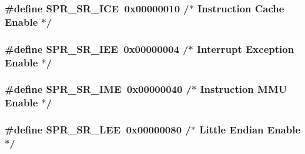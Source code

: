 \hypertarget{spr-defs_8h_a386792a3bd4348db52eb28cbd133a0d0}{
\subsubsection[{\-S\-P\-R\-\_\-\-S\-R\-\_\-\-I\-C\-E}]{\setlength{\rightskip}{0pt plus 5cm}\#define {\bf \-S\-P\-R\-\_\-\-S\-R\-\_\-\-I\-C\-E}~0x00000010  /$\ast$ Instruction Cache Enable $\ast$/}}\label{spr-defs_8h_a386792a3bd4348db52eb28cbd133a0d0}
\hypertarget{spr-defs_8h_a9a5f711e7e1346e1516179b4737fd54d}{
\subsubsection[{\-S\-P\-R\-\_\-\-S\-R\-\_\-\-I\-E\-E}]{\setlength{\rightskip}{0pt plus 5cm}\#define {\bf \-S\-P\-R\-\_\-\-S\-R\-\_\-\-I\-E\-E}~0x00000004  /$\ast$ Interrupt Exception Enable $\ast$/}}\label{spr-defs_8h_a9a5f711e7e1346e1516179b4737fd54d}
\hypertarget{spr-defs_8h_a9e9f5f7a1059b61a5611f66400092d9e}{
\subsubsection[{\-S\-P\-R\-\_\-\-S\-R\-\_\-\-I\-M\-E}]{\setlength{\rightskip}{0pt plus 5cm}\#define {\bf \-S\-P\-R\-\_\-\-S\-R\-\_\-\-I\-M\-E}~0x00000040  /$\ast$ Instruction M\-M\-U Enable $\ast$/}}\label{spr-defs_8h_a9e9f5f7a1059b61a5611f66400092d9e}
\hypertarget{spr-defs_8h_ae498c800649c3db2373a1ceb2ad1e573}{
\subsubsection[{\-S\-P\-R\-\_\-\-S\-R\-\_\-\-L\-E\-E}]{\setlength{\rightskip}{0pt plus 5cm}\#define {\bf \-S\-P\-R\-\_\-\-S\-R\-\_\-\-L\-E\-E}~0x00000080  /$\ast$ Little Endian Enable $\ast$/}}\label{spr-defs_8h_ae498c800649c3db2373a1ceb2ad1e573}

